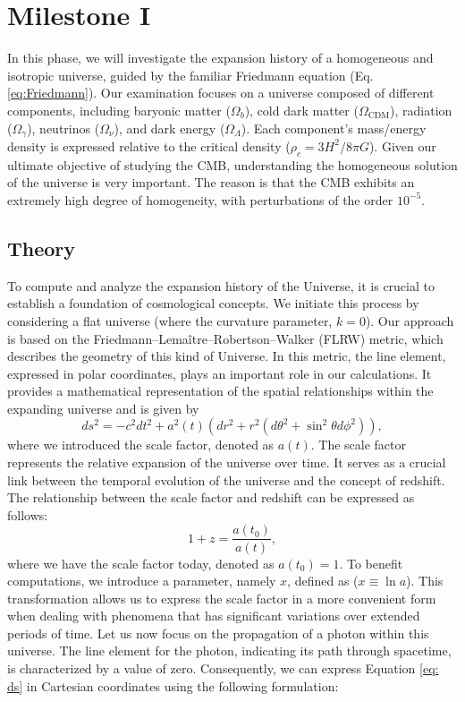 \documentclass{aa}
\begin{document}
\section{Milestone I}\label{section:M1}
In this phase, we will investigate the expansion history of a homogeneous and isotropic universe, guided by the familiar Friedmann equation (Eq. \ref{eq:Friedmann}). Our examination focuses on a universe composed of different components, including baryonic matter ($\Omega_b$), cold dark matter ($\Omega_\mathrm{CDM}$), radiation ($\Omega_\gamma$), neutrinos ($\Omega_\nu$), and dark energy ($\Omega_\Lambda$). Each component's mass/energy density is expressed relative to the critical density ($\rho_c = 3H^2/8\pi G$). Given our ultimate objective of studying the CMB, understanding the homogeneous solution of the universe is very important. The reason is that the CMB exhibits an extremely high degree of homogeneity, with perturbations of the order $10^{-5}$.

\subsection{Theory}
To compute and analyze the expansion history of the Universe, it is crucial to establish a foundation of cosmological concepts. We initiate this process by considering a flat universe (where the curvature parameter, $k = 0$). Our approach is based on the Friedmann–Lemaître–Robertson–Walker (FLRW) metric, which describes the geometry of this kind of Universe. In this metric, the line element, expressed in polar coordinates, plays an important role in our calculations. It provides a mathematical representation of the spatial relationships within the expanding universe and is given by
\begin{equation}\label{eq: ds}
    ds^2 = -c^2 dt^2 + a^2(t) \left( dr^2 + r^2(d\theta^2 + \sin^2
    \theta d\phi^2) \right),
\end{equation}
where we introduced the scale factor, denoted as $a(t)$. The scale factor represents the relative expansion of the universe over time. It serves as a crucial link between the temporal evolution of the universe and the concept of redshift. The relationship between the scale factor and redshift can be expressed as follows:
\begin{equation}\label{eq: redshift}
    1 + z = \frac{a(t_0)}{a(t)},
\end{equation}
where we have the scale factor today, denoted as $a(t_0) = 1$. To benefit computations, we introduce a parameter, namely $x$, defined as ($x \equiv \ln a$). This transformation allows us to express the scale factor in a more convenient form when dealing with phenomena that has significant variations over extended periods of time. Let us now focus on the propagation of a photon within this universe. The line element for the photon, indicating its path through spacetime, is characterized by a value of zero. Consequently, we can express Equation \eqref{eq: ds} in Cartesian coordinates using the following formulation:
\end{document}
